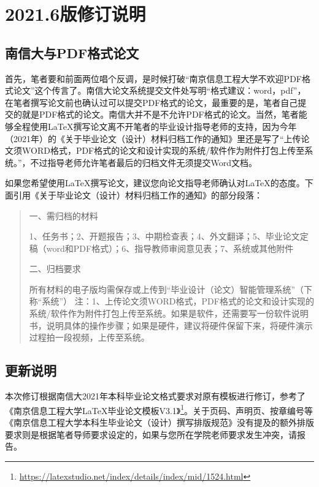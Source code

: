 \section{2021.6版修订说明}

\subsection{南信大与PDF格式论文}
首先，笔者要和前面两位唱个反调，是时候打破“南京信息工程大学不欢迎PDF格式论文”这个传言了。南信大论文系统提交文件处写明“格式建议：word，pdf”，在笔者撰写论文前也确认过可以提交PDF格式的论文，最重要的是，笔者自己提交的就是PDF格式的论文。南信大并不是不允许PDF格式的论文。当然，笔者能够全程使用\LaTeX 撰写论文离不开笔者的毕业设计指导老师的支持，因为今年（2021年）的《关于毕业论文（设计）材料归档工作的通知》里还是写了“上传论文须WORD格式，PDF格式的论文和设计实现的系统/软件作为附件打包上传至系统。”，不过指导老师允许笔者最后的归档文件无须提交Word文档。

如果您希望使用\LaTeX 撰写论文，建议您向论文指导老师确认对\LaTeX 的态度。下面引用《关于毕业论文（设计）材料归档工作的通知》的部分段落：
\begin{quote}
一、需归档的材料

1、任务书；2、开题报告；3、中期检查表；4、外文翻译；5、毕业论文定稿（word和PDF格式）；6、指导教师审阅意见表；7、系统或其他附件

二、归档要求

所有材料的电子版均需保存或上传到“毕业设计（论文）智能管理系统”（下称“系统”）
注：1、上传论文须WORD格式，PDF格式的论文和设计实现的系统/软件作为附件打包上传至系统。如果是软件，还需要写一份软件说明书，说明具体的操作步骤；如果是硬件，建议将硬件保留下来，将硬件演示过程拍一段视频，上传至系统。

\end{quote}

\subsection{更新说明}
本次修订根据南信大2021年本科毕业论文格式要求对原有模板进行修订，参考了《南京信息工程大学LaTeX毕业论文模板V3.1》\footnote{\url{https://latexstudio.net/index/details/index/mid/1524.html}}。关于页码、声明页、按章编号等《南京信息工程大学本科生毕业论文（设计）撰写排版规范》没有提及的额外排版要求则是根据笔者导师要求设定的，如果与您所在学院老师要求发生冲突，请报告。

